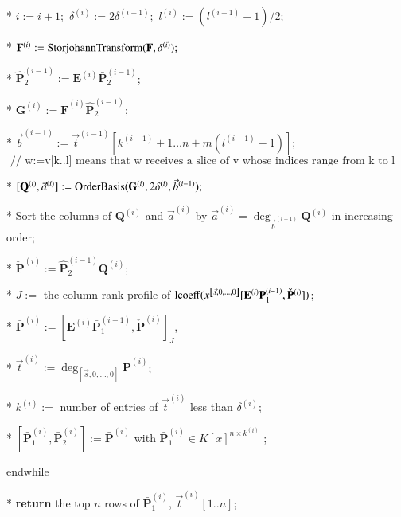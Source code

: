 \begin{algorithm}[t]
\begin{algor}[1]
\item [{{{*}}}] $i:=i+1;$ $\delta^{\left(i\right)}:=2\delta^{\left(i-1\right)};$
$l^{\left(i\right)}:=(l^{\left(i-1\right)}-1)/2;$ 
\item [{{{*}}}] $\bar{\mathbf{F}}^{\left(i\right)}:=\StorjohannTransform(\mathbf{F},\delta^{\left(i\right)});$ 
\item [{{{*}}}] $\hat{\mathbf{P}}_{2}^{\left(i-1\right)}:=\mathbf{E}^{\left(i\right)}\bar{\mathbf{P}}_{2}^{\left(i-1\right)}$;
\item [{{{*}}}] \label{line:matrixProduct1}$\mathbf{G}^{\left(i\right)}:=\bar{\mathbf{F}}^{\left(i\right)}\hat{\mathbf{P}}_{2}^{\left(i-1\right)};$ 
\item [{{{*}}}] $\vec{b}^{\left(i-1\right)}:=\vec{t}^{\left(i-1\right)}[k^{\left(i-1\right)}+1\dots n+m(l^{\left(i-1\right)}-1)];$
\\
$\mbox{ // w:=v[k..l] means that w receives a slice of v whose indices range from k to l}$
\item [{{{*}}}] \label{line:orderBasisComputation}$[\mathbf{Q}^{\left(i\right)},\vec{a}^{\left(i\right)}]:=\mab(\mathbf{G}^{\left(i\right)},2\delta^{\left(i\right)},\vec{b}^{\left(i-1\right)});$ 
\item [{{{*}}}] Sort the columns of $\mathbf{Q}^{\left(i\right)}$ and
$\vec{a}^{\left(i\right)}$ by $\vec{a}^{\left(i\right)}=\deg_{\vec{b}^{\left(i-1\right)}}\mathbf{Q}^{\left(i\right)}$
in increasing order; 
\item [{{{*}}}] \label{line:matrixProduct2}$\check{\mathbf{P}}^{\left(i\right)}:=\hat{\mathbf{P}}_{2}^{\left(i-1\right)}\mathbf{Q}^{\left(i\right)};$ 
\item [{{{*}}}] \label{line:LSP}$J:=$ the column rank profile of $\operatorname{lcoeff}(x^{\left[\vec{s},0,\dots,0\right]}[\mathbf{E}^{\left(i\right)}\relax{\mathbf{P}}_{1}^{\left(i-1\right)},\check{\mathbf{P}}^{\left(i\right)}])$; 
\item [{{*}}] $\bar{\mathbf{P}}^{\left(i\right)}:=[\mathbf{E}^{\left(i\right)}\bar{\mathbf{P}}_{1}^{\left(i-1\right)},\check{\mathbf{P}}^{\left(i\right)}]_{J}$,
\item [{{*}}] $\vec{t}^{\left(i\right)}:=\deg_{\left[\vec{s},0,\dots,0\right]}\bar{\mathbf{P}}^{\left(i\right)}$; 
\item [{{{*}}}] $k^{\left(i\right)}:=$ number of entries of $\vec{t}^{\left(i\right)}$
less than $\delta^{\left(i\right)}$;
\item [{{*}}] $[\bar{\mathbf{P}}_{1}^{\left(i\right)},\bar{\mathbf{P}}_{2}^{\left(i\right)}]:=\bar{\mathbf{P}}^{\left(i\right)}$
with $\bar{\mathbf{P}}_{1}^{\left(i\right)}\in K\left[x\right]^{n\times k^{\left(i\right)}}$
;
\item [{{endwhile}}] ~ 
\item [{{{*}}}] \textbf{return} the top $n$ rows of $\bar{\mathbf{P}}_{1}^{\left(i\right)}$,
$\vec{t}^{\left(i\right)}\left[1..n\right]$; 
\end{algor}

\end{algorithm}

